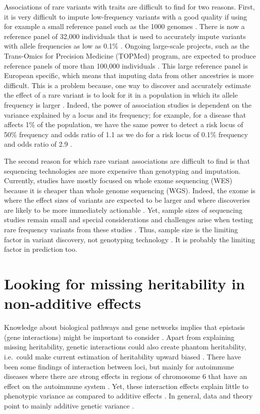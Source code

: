 Associations of rare variants with traits are difficult to find for two reasons. 
First, it is very difficult to impute low-frequency variants with a good quality if using for example a small reference panel such as the 1000 genomes \cite[]{nikpay2015comprehensive}. There is now a reference panel of 32,000 individuals that is used to accurately impute variants with allele frequencies as low as 0.1\% \cite[]{mccarthy2016reference}. Ongoing large-scale projects, such as the Trans-Omics for Precision Medicine (TOPMed) program, are expected to produce reference panels 
of more than 100,000 individuals \cite[]{taliun2019sequencing}.
This large reference panel is European specific, which means that imputing data from other ancestries is more difficult. This is a problem because, one way to discover and accurately estimate the effect of a rare variant is to look for it in a population in which its allele frequency is larger \cite[]{moltke2014common,minster2016thrifty}. 
Indeed, the power of association studies is dependent on the variance explained by a locus and its frequency; for example, for a disease that affects 1\% of the population, we have the same power to detect a risk locus of 50\% frequency and odds ratio of 1.1 as we do for a risk locus of 0.1\% frequency and odds ratio of 2.9 \cite[]{wray2018common}.

The second reason for which rare variant associations are difficult to find is that sequencing technologies are more expensive than genotyping and imputation. Currently, studies have mostly focused on whole exome sequencing (WES) because it is cheaper than whole genome sequencing (WGS). 
Indeed, the exome is where the effect sizes of variants are expected to be larger and where discoveries are likely to be more immediately actionable \cite[]{zuk2014searching}. 
Yet, sample sizes of sequencing studies remain small and special considerations and challenges arise when testing rare frequency variants from these studies \cite[]{auer2015rare}.
Thus, sample size is the limiting factor in variant discovery, not genotyping technology \cite[]{wray2018common}. 
It is probably the limiting factor in prediction too.

\section{Looking for missing heritability in non-additive effects}

Knowledge about biological pathways and gene networks implies that epistasis (gene interactions) might be important to consider \cite[]{hill2008data}. 
Apart from explaining missing heritability, genetic interactions could also create phantom heritability, i.e.\ could make current estimation of heritability upward biased \cite[]{zuk2012mystery}.
There have been some findings of interaction between loci, but mainly for autoimmune diseases where there are strong effects in regions of chromosome 6 that have an effect on the autoimmune system \cite[]{lenz2015widespread,goudey2017interactions}.
Yet, these interaction effects explain little to phenotypic variance as compared to additive effects \cite[]{lenz2015widespread}.
In general, data and theory point to mainly additive genetic variance \cite[]{hill2008data}.


